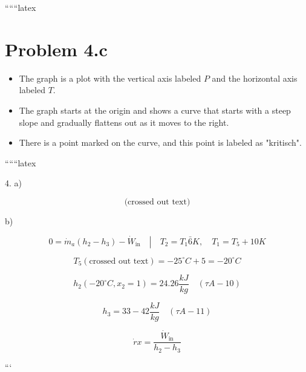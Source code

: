 
``````latex


\section*{Problem 4.c}

\begin{itemize}
    \item The graph is a plot with the vertical axis labeled \( P \) and the horizontal axis labeled \( T \).
    \item The graph starts at the origin and shows a curve that starts with a steep slope and gradually flattens out as it moves to the right.
    \item There is a point marked on the curve, and this point is labeled as "kritisch".
\end{itemize}

``````latex

4. a)

\[
\text{(crossed out text)}
\]

b)

\[
0 = \dot{m}_a (h_2 - h_3) - \dot{W}_{\text{in}} \quad \left| \quad T_2 = T_1 \bar{6} K, \quad T_1 = T_5 + 10 K \right.
\]

\[
T_5 \left( \text{crossed out text} \right) = -25^\circ C + 5 = -20^\circ C
\]

\[
h_2 (-20^\circ C, x_2 = 1) = 24.26 \frac{kJ}{kg} \quad (\tau A - 10)
\]

\[
h_3 = 33 - 42 \frac{kJ}{kg} \quad (\tau A - 11)
\]

\[
\dot{r} x = \frac{\dot{W}_{\text{in}}}{h_2 - h_3}
\]

```